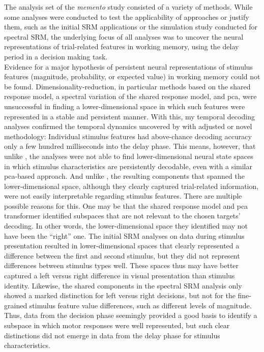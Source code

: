 The analysis set of the \textit{memento} study consisted of a variety of methods.
While some analyses were conducted to test the applicability of approaches or justify them, such as the initial \gls{SRM} applications or the simulation study conducted for spectral \gls{SRM}, the underlying focus of all analyses was to uncover the neural representations of trial-related features in working memory, using the delay period in a decision making task.\\
Evidence for a major hypothesis of persistent neural representations of stimulus features (magnitude, probability, or expected value) in working memory could not be found.
Dimensionality-reduction, in particular methods based on the shared response model, a spectral variation of the shared response model, and \gls{pca}, were unsuccessful in finding a lower-dimensional space in which such features were represented in a stable and persistent manner.
With this, my temporal decoding analyses confirmed the temporal dynamics uncovered by \citet{kaiserposter} with adjusted or novel methodology:
Individual stimulus features had above-chance decoding accuracy only a few hundred milliseconds into the delay phase.
This means, however, that unlike \citet{murray2017stable}, the analyses were not able to find lower-dimensional neural state spaces in which stimulus characteristics are persistently decodable, even with a similar \gls{pca}-based approach.
And unlike \citet{machens2010functional}, the resulting components that spanned the lower-dimensional space, although they clearly captured trial-related information, were not easily interpretable regarding stimulus features.
There are multiple possible reasons for this.
One may be that the shared response model and \gls{pca} transformer identified subspaces that are not relevant to the chosen targets' decoding.
In other words, the lower-dimensional space they identified may not have been the ``right'' one.
The initial \gls{SRM} analyses on data during stimulus presentation resulted in lower-dimensional spaces that clearly represented a difference between the first and second stimulus, but they did not represent differences between stimulus types well.
These spaces thus may have better captured a left versus right difference in visual presentation than stimulus identity.
Likewise, the shared components in the spectral \gls{SRM} analysis only showed a marked distinction for left versus right decisions, but not for the fine-grained stimulus feature value differences, such as different levels of magnitude.
Thus, data from the decision phase seemingly provided a good basis to identify a subspace in which motor responses were well represented, but such clear distinctions did not emerge in data from the delay phase for stimulus characteristics.

